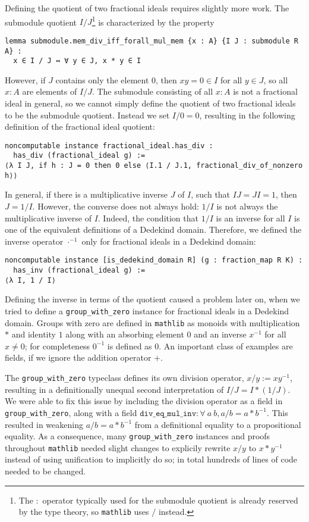 \documentclass[a4paper,USenglish,cleveref, autoref, thm-restate]{lipics-v2021}
\newcommand{\lean}[1]{\texttt{#1}\xspace} %
\newcommand{\mathlib}{\texttt{mathlib}\xspace}
\begin{document}
Defining the quotient of two fractional ideals requires slightly more work.
The submodule quotient $I / J$\footnote{The $:$ operator typically used for the submodule quotient is already reserved by the type theory, so \mathlib uses $/$ instead.} is characterized by the property
\begin{lstlisting}
lemma submodule.mem_div_iff_forall_mul_mem {x : A} {I J : submodule R A} :
  x ∈ I / J ↔ ∀ y ∈ J, x * y ∈ I
\end{lstlisting}
However, if $J$ contains only the element $0$,
then $xy = 0 \in I$ for all $y \in J$, so all $x : A$ are elements of $I / J$.
The submodule consisting of all $x : A$ is not a fractional ideal in general,
so we cannot simply define the quotient of two fractional ideals to be the submodule quotient.
Instead we set $I / 0 = 0$, resulting in the following definition of the fractional ideal quotient:
\begin{lstlisting}
noncomputable instance fractional_ideal.has_div :
  has_div (fractional_ideal g) :=
⟨λ I J, if h : J = 0 then 0 else ⟨I.1 / J.1, fractional_div_of_nonzero h⟩⟩
\end{lstlisting}

In general, if there is a multiplicative inverse $J$ of $I$, such that $I J = J I = 1$, then $J = 1 / I$.
However, the converse does not always hold: $1 / I$ is not always the multiplicative inverse of $I$.
Indeed, the condition that $1 / I$ is an inverse for all $I$ is one of the equivalent definitions of a Dedekind domain.
Therefore, we defined the inverse operator $\cdot^{-1}$ only for fractional ideals in a Dedekind domain:
\begin{lstlisting}
noncomputable instance [is_dedekind_domain R] (g : fraction_map R K) :
  has_inv (fractional_ideal g) :=
⟨λ I, 1 / I⟩
\end{lstlisting}

Defining the inverse in terms of the quotient caused a problem later on, when we tried to define a \lean{group\_with\_zero} instance for fractional ideals in a Dedekind domain.
Groups with zero are defined in \mathlib as monoids with multiplication $*$ and identity $1$ along with an absorbing element $0$ and an inverse $x^{-1}$ for all $x \ne 0$; for completeness $0^{-1}$ is defined as $0$.
An important class of examples are fields, if we ignore the addition operator $+$.

The \lean{group\_with\_zero} typeclass defines its own division operator, $x / y := x y^{-1}$,
resulting in a definitionally unequal second interpretation of $I / J = I * (1 / J)$.
We were able to fix this issue by including the division operator as a field in \lean{group\_with\_zero},
along with a field $\lean{div\_eq\_mul\_inv} : \forall\ a\ b, a / b = a * b^{-1}$.
This resulted in weakening $a / b = a * b^{-1}$ from a definitional equality to a propositional equality.
As a consequence, many \lean{group\_with\_zero} instances and proofs throughout \mathlib needed slight changes to explicily rewrite $x / y$ to $x * y^{-1}$ instead of using unification to implicitly do so; in total hundreds of lines of code needed to be changed.
\end{document}
